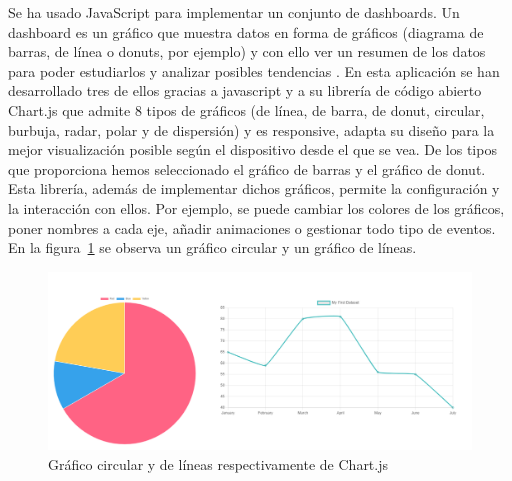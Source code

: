 \documentclass[a4paper, 12pt]{book}
\begin{document}
\begin{enumerate}[a)]
       Se ha usado JavaScript para implementar un conjunto de dashboards. Un dashboard es un gráfico que muestra datos en forma de gráficos (diagrama de barras, de línea o donuts, por ejemplo) y con ello ver un resumen de los datos para poder estudiarlos y analizar posibles tendencias . En esta aplicación se han desarrollado tres de ellos gracias a javascript y a su librería de código abierto Chart.js que admite 8 tipos de gráficos (de línea, de barra, de donut, circular, burbuja, radar, polar y de dispersión) y es responsive, adapta su diseño para la mejor visualización posible según el dispositivo desde el que se vea. De los tipos que proporciona hemos seleccionado el gráfico de barras y el gráfico de donut. Esta librería, además de implementar dichos gráficos, permite la configuración y la interacción con ellos. Por ejemplo, se puede cambiar los colores de los gráficos, poner nombres a cada eje, añadir animaciones o gestionar todo tipo de eventos. En la figura~\ref{figura:js} se observa un gráfico circular y un gráfico de líneas. 
    \begin{figure}[h]
            \centering
            \includegraphics[scale=0.5]{img/chart.PNG}
            \caption{Gráfico circular y de líneas respectivamente de Chart.js}
            \label{figura:js}
        \end{figure}
    
       
\end{enumerate}
\end{document}

